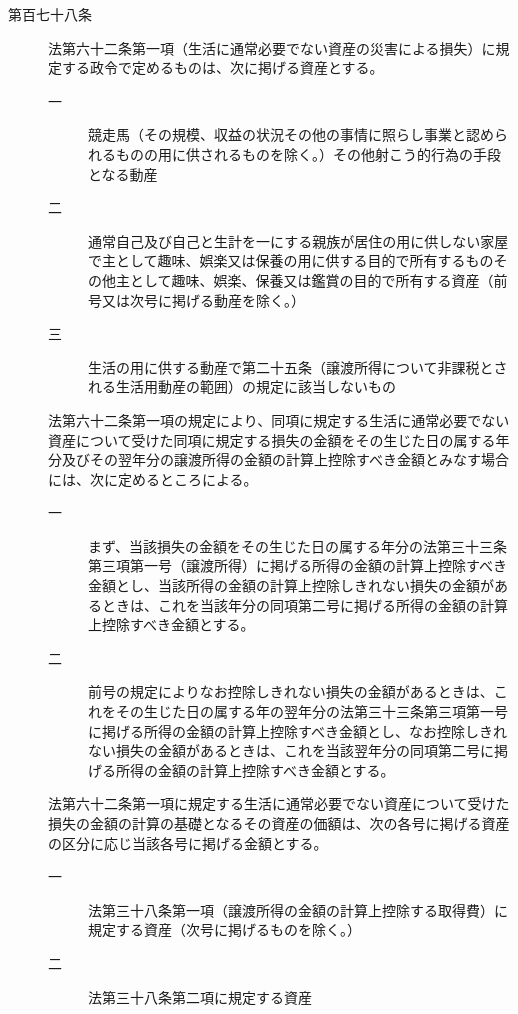 \documentclass[twocolumn,a4j,10pt]{ltjtarticle}
\begin{document}
\begin{description}
\item[第百七十八条]法第六十二条第一項（生活に通常必要でない資産の災害による損失）に規定する政令で定めるものは、次に掲げる資産とする。
\begin{description}
\item[一]競走馬（その規模、収益の状況その他の事情に照らし事業と認められるものの用に供されるものを除く。）その他射こう的行為の手段となる動産
\item[二]通常自己及び自己と生計を一にする親族が居住の用に供しない家屋で主として趣味、娯楽又は保養の用に供する目的で所有するものその他主として趣味、娯楽、保養又は鑑賞の目的で所有する資産（前号又は次号に掲げる動産を除く。）
\item[三]生活の用に供する動産で第二十五条（譲渡所得について非課税とされる生活用動産の範囲）の規定に該当しないもの
\end{description}
\item[]法第六十二条第一項の規定により、同項に規定する生活に通常必要でない資産について受けた同項に規定する損失の金額をその生じた日の属する年分及びその翌年分の譲渡所得の金額の計算上控除すべき金額とみなす場合には、次に定めるところによる。
\begin{description}
\item[一]まず、当該損失の金額をその生じた日の属する年分の法第三十三条第三項第一号（譲渡所得）に掲げる所得の金額の計算上控除すべき金額とし、当該所得の金額の計算上控除しきれない損失の金額があるときは、これを当該年分の同項第二号に掲げる所得の金額の計算上控除すべき金額とする。
\item[二]前号の規定によりなお控除しきれない損失の金額があるときは、これをその生じた日の属する年の翌年分の法第三十三条第三項第一号に掲げる所得の金額の計算上控除すべき金額とし、なお控除しきれない損失の金額があるときは、これを当該翌年分の同項第二号に掲げる所得の金額の計算上控除すべき金額とする。
\end{description}
\item[]法第六十二条第一項に規定する生活に通常必要でない資産について受けた損失の金額の計算の基礎となるその資産の価額は、次の各号に掲げる資産の区分に応じ当該各号に掲げる金額とする。
\begin{description}
\item[一]法第三十八条第一項（譲渡所得の金額の計算上控除する取得費）に規定する資産（次号に掲げるものを除く。）
\item[二]法第三十八条第二項に規定する資産
\end{description}
\end{description}
\end{document}
